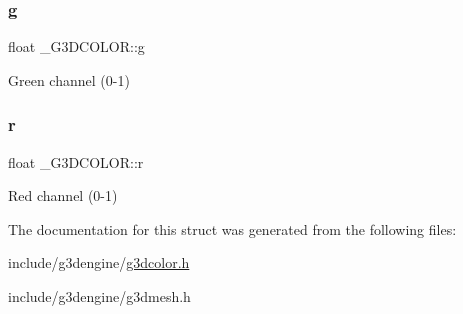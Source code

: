 \subsubsection{\texorpdfstring{g}{g}}
{\footnotesize\ttfamily float \+\_\+\+G3\+D\+C\+O\+L\+O\+R\+::g}

Green channel (0-\/1) \mbox{\label{struct__G3DCOLOR_a5d4de59d19a31c17b892f15478ff3a34}} 
\subsubsection{\texorpdfstring{r}{r}}
{\footnotesize\ttfamily float \+\_\+\+G3\+D\+C\+O\+L\+O\+R\+::r}

Red channel (0-\/1) 

The documentation for this struct was generated from the following files\+:\begin{DoxyCompactItemize}
\item 
include/g3dengine/\hyperlink{g3dcolor_8h}{g3dcolor.\+h}\item 
include/g3dengine/g3dmesh.\+h\end{DoxyCompactItemize}
